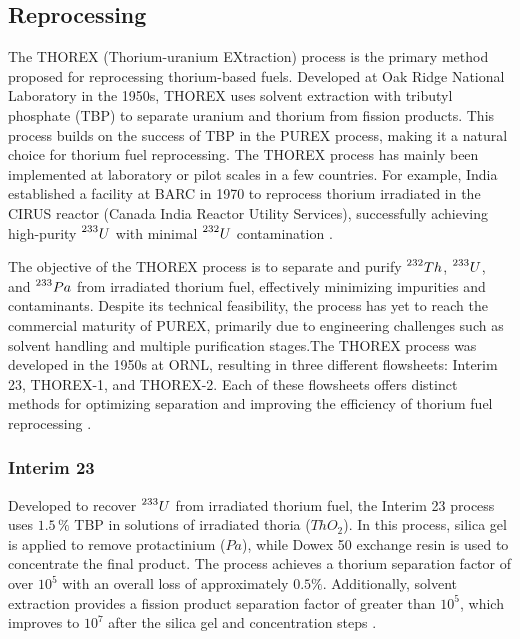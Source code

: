 \subsection{Reprocessing}

The THOREX (Thorium-uranium EXtraction) process is the primary method proposed for reprocessing thorium-based fuels. Developed at Oak Ridge National Laboratory in the 1950s, THOREX uses solvent extraction with tributyl phosphate (TBP) to separate uranium and thorium from fission products. This process builds on the success of TBP in the PUREX process, making it a natural choice for thorium fuel reprocessing. The THOREX process has mainly been implemented at laboratory or pilot scales in a few countries. For example, India established a facility at BARC in 1970 to reprocess thorium irradiated in the CIRUS reactor (Canada India Reactor Utility Services), successfully achieving high-purity \(\prescript{233}{}{U}\) with minimal \(\prescript{232}{}{U}\) contamination \cite{IAEA_Th_Potential,fuel_cycle_book}.

The objective of the THOREX process is to separate and purify \(\prescript{232}{}{Th}\), \(\prescript{233}{}{U}\), and \(\prescript{233}{}{Pa}\) from irradiated thorium fuel, effectively minimizing impurities and contaminants. Despite its technical feasibility, the process has yet to reach the commercial maturity of PUREX, primarily due to engineering challenges such as solvent handling and multiple purification stages.The THOREX process was developed in the 1950s at ORNL, resulting in three different flowsheets: Interim 23, THOREX-1, and THOREX-2. Each of these flowsheets offers distinct methods for optimizing separation and improving the efficiency of thorium fuel reprocessing \cite{fuel_cycle_book,Achuthan2013}.  


\subsubsection{Interim 23}

Developed to recover \(\prescript{233}{}{U}\) from irradiated thorium fuel, the Interim 23 process uses \(1.5 \, \%\) TBP in solutions of irradiated thoria (\(ThO_2\)). In this process, silica gel is applied to remove protactinium (\(Pa\)), while Dowex 50 exchange resin is used to concentrate the final product. The process achieves a thorium separation factor of over \(10^5\) with an overall loss of approximately \(0.5\%\). Additionally, solvent extraction provides a fission product separation factor of greater than \(10^5\), which improves to \(10^7\) after the silica gel and concentration steps \cite{fuel_cycle_book}.


